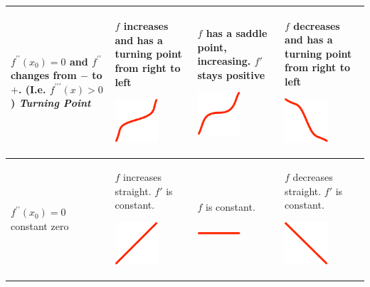 \begin{table}
{\begin{center}
\begin{tabular}{p{17mm}|p{25mm}|p{25mm}|p{25mm}}
\hline
\begin{raggedright}%
$f^{\prime\prime}(x_0)=0$
{\footnotesize 
and $f^{\prime\prime}$ changes from $-$ to $+$. (I.e.
$f^{\prime\prime\prime}(x)>0$)}
{\em Turning Point}
\end{raggedright}&
\begin{raggedright}
$f$ increases and has a turning point
from right to left
\centerline{\includegraphics[width=16mm]{pic/CUL.pdf}}
\end{raggedright}&%
\begin{raggedright}
$f$ has a saddle point, increasing.
$f'$ stays positive
\centerline{\includegraphics[width=16mm]{pic/CSU.pdf}}
\end{raggedright}&%
\begin{raggedright}
$f$ decreases and has a turning point
from right to left
\centerline{\includegraphics[width=16mm]{pic/CDL.pdf}}
\end{raggedright}\\

\hline
$f^{\prime\prime}(x_0)=0$ constant zero&
\begin{raggedright}
$f$ increases straight. $f'$ is constant.
\centerline{\includegraphics[width=16mm]{pic/CIN.pdf}}
\end{raggedright}&%
\begin{raggedright}
$f$ is constant.
\centerline{\includegraphics[width=16mm]{pic/CCO.pdf}}
\end{raggedright}&%
\begin{raggedright}
$f$ decreases straight. $f'$ is constant.
\centerline{\includegraphics[width=16mm]{pic/CDE.pdf}}
\end{raggedright}
\\


\end{tabular}
\end{center}}
\end{table}
